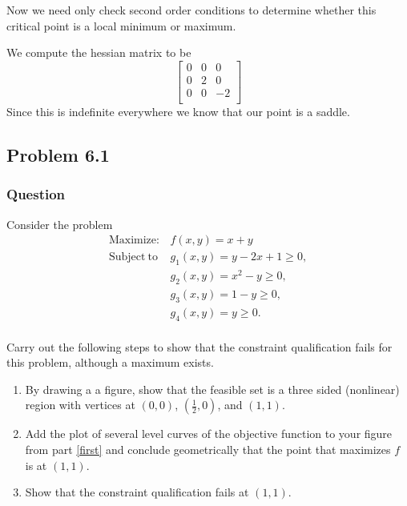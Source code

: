 \documentclass[12pt]{article}
\begin{document}
\begin{enumerate}
Now we need only check second order conditions to determine whether this critical point is a local minimum or maximum.

We compute the hessian matrix to be
\[\left[
\begin{array}{lcr}
0&0&0\\
0&2&0\\
0&0&-2\\
\end{array}\right]
\] 
Since this is indefinite everywhere we know that our point is a saddle.


\end{enumerate}


\subsection{Problem 6.1}
\subsubsection{Question}
Consider the problem
\[
\begin{array}{ll}
\mathrm{Maximize:} & f(x,y)=x+y\\
\mathrm{Subject\ to} & g_1(x,y) = y-2x +1 \geq 0,\\
&g_2(x,y)=x^2-y \geq 0,\\
&g_3(x,y)=1-y \geq 0 , \\
&g_4(x,y) = y \geq 0.\\
\end{array}
\]

Carry out the following steps to show that the constraint qualification fails for this problem, although a maximum exists.
\begin{enumerate}
\item \label{first} By drawing a a figure, show that the feasible set is a three sided (nonlinear) region with vertices at $(0,0)$, $(\frac{1}{2},0)$, and $(1,1)$. 
\item Add the plot of several level curves of the objective function to your figure from part \ref{first} and conclude geometrically that the point that maximizes $f$ is at $(1,1)$.
\item Show that the constraint qualification fails at $(1,1)$.

\end{enumerate}
\end{document}
